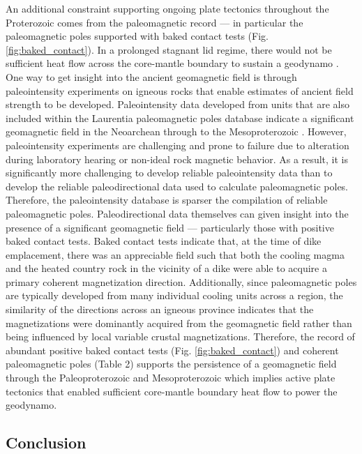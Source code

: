 \documentclass[twocolumn, switch]{article} %
\begin{document}
An additional constraint supporting ongoing plate tectonics throughout the Proterozoic comes from the paleomagnetic record --- in particular the paleomagnetic poles supported with baked contact tests (Fig. \ref{fig:baked_contact}). In a prolonged stagnant lid regime, there would not be sufficient heat flow across the core-mantle boundary to sustain a geodynamo \citep{Nimmo2000a, Buffett2000b}. One way to get insight into the ancient geomagnetic field is through paleointensity experiments on igneous rocks that enable estimates of ancient field strength to be developed.  Paleointensity data developed from units that are also included within the Laurentia paleomagnetic poles database indicate a significant geomagnetic field in the Neoarchean \citep{Selkin2000a} through to the Mesoproterozoic \citep{Macouin2006a, Sprain2018a}. However, paleointensity experiments are challenging and prone to failure due to alteration during laboratory hearing or non-ideal rock magnetic behavior. As a result, it is significantly more challenging to develop reliable paleointensity data than to develop the reliable paleodirectional data used to calculate paleomagnetic poles. Therefore, the paleointensity database is sparser the compilation of reliable paleomagnetic poles. Paleodirectional data themselves can given insight into the presence of a significant geomagnetic field --- particularly those with positive baked contact tests. Baked contact tests indicate that, at the time of dike emplacement, there was an appreciable field such that both the cooling magma and the heated country rock in the vicinity of a dike were able to acquire a primary coherent magnetization direction. Additionally, since paleomagnetic poles are typically developed from many individual cooling units across a region, the similarity of the directions across an igneous province indicates that the magnetizations were dominantly acquired from the geomagnetic field rather than being influenced by local variable crustal magnetizations.  Therefore, the record of abundant positive baked contact tests (Fig. \ref{fig:baked_contact}) and coherent paleomagnetic poles (Table 2) supports the persistence of a geomagnetic field through the Paleoproterozoic and Mesoproterozoic which implies active plate tectonics that enabled sufficient core-mantle boundary heat flow to power the geodynamo.

\subsection{Conclusion}
\end{document}

